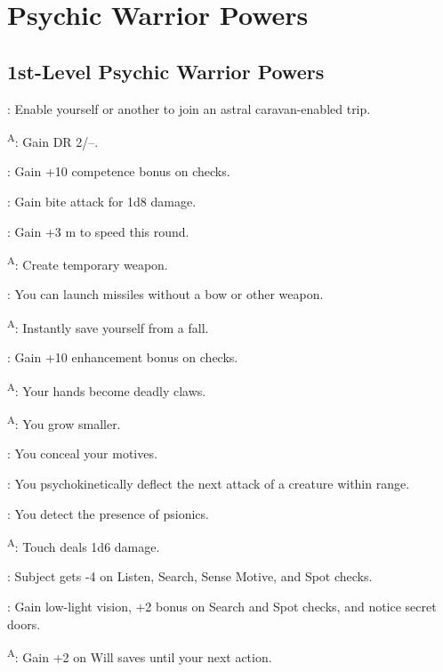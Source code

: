 \section{Psychic Warrior Powers}




\subsection{1st-Level Psychic Warrior Powers}

: Enable yourself or another to join an astral caravan-enabled trip.

\textsuperscript{A}: Gain DR 2/--.

: Gain +10 competence bonus on  checks. %

: Gain bite attack for 1d8 damage.

: Gain +3 m to speed this round.

\textsuperscript{A}: Create temporary weapon.

: You can launch missiles without a bow or other weapon. %

\textsuperscript{A}: Instantly save yourself from a fall.

: Gain +10 enhancement bonus on  checks.

\textsuperscript{A}: Your hands become deadly claws.

\textsuperscript{A}: You grow smaller.

: You conceal your motives.

: You psychokinetically deflect the next attack of a creature within range. %

: You detect the presence of psionics.

\textsuperscript{A}: Touch deals 1d6 damage.

: Subject gets -4 on Listen, Search, Sense Motive, and Spot checks.

: Gain low-light vision, +2 bonus on Search and Spot checks, and notice secret doors.

\textsuperscript{A}: Gain +2 on Will saves until your next action.

